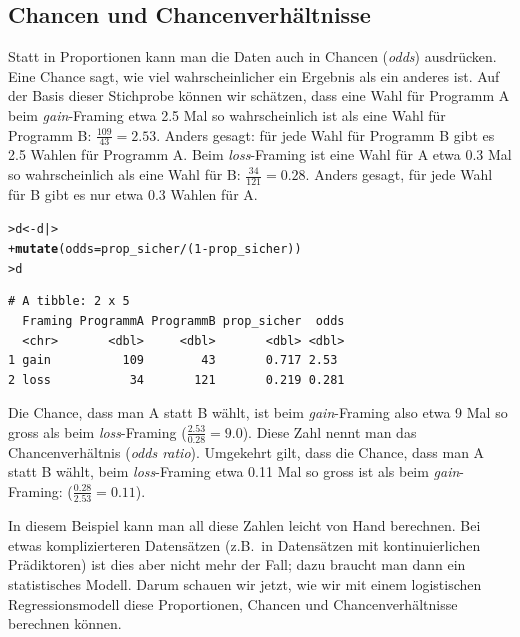 \documentclass[oneside, 10pt]{book}\usepackage[]{graphicx}\usepackage[]{xcolor}
\makeatletter
\newcommand{\hlnum}[1]{\textcolor[rgb]{0.686,0.059,0.569}{#1}}%
\newcommand{\hlopt}[1]{\textcolor[rgb]{0,0,0}{#1}}%
\newcommand{\hlstd}[1]{\textcolor[rgb]{0.345,0.345,0.345}{#1}}%
\newcommand{\hlkwb}[1]{\textcolor[rgb]{0.69,0.353,0.396}{#1}}%
\newcommand{\hlkwc}[1]{\textcolor[rgb]{0.333,0.667,0.333}{#1}}%
\newcommand{\hlkwd}[1]{\textcolor[rgb]{0.737,0.353,0.396}{\textbf{#1}}}%
\newenvironment{kframe}{%
 \def\at@end@of@kframe{}%
 \ifinner\ifhmode%
  \def\at@end@of@kframe{\end{minipage}}%
  \begin{minipage}{\columnwidth}%
 \fi\fi%
 \def\FrameCommand##1{\hskip\@totalleftmargin \hskip-\fboxsep
 \colorbox{shadecolor}{##1}\hskip-\fboxsep
     \hskip-\linewidth \hskip-\@totalleftmargin \hskip\columnwidth}%
 \MakeFramed {\advance\hsize-\width
   \@totalleftmargin\z@ \linewidth\hsize
   \@setminipage}}%
 {\par\unskip\endMakeFramed%
 \at@end@of@kframe}
\newenvironment{knitrout}{}{} %
\makeatother
\begin{document}
\subsection{Chancen und Chancenverhältnisse}
Statt in Proportionen kann man die Daten auch
in Chancen (\textit{odds}) ausdrücken. Eine Chance sagt, wie
viel wahrscheinlicher ein Ergebnis als ein anderes
ist. Auf der Basis dieser Stichprobe können
wir schätzen, dass eine Wahl für Programm A
beim \textit{gain}-Framing etwa 2.5 Mal
so wahrscheinlich ist als eine Wahl für Programm B:
$\frac{109}{43} = 2.53$. Anders gesagt: für
jede Wahl für Programm B gibt es 2.5 Wahlen für
Programm A.
Beim \textit{loss}-Framing ist eine
Wahl für A etwa 0.3 Mal so wahrscheinlich als eine
Wahl für B: $\frac{34}{121} = 0.28$. Anders gesagt,
für jede Wahl für B gibt es nur etwa 0.3 Wahlen für
A.
\begin{knitrout}
\color{fgcolor}\begin{kframe}
\begin{alltt}
\hlstd{> }\hlstd{d} \hlkwb{<-} \hlstd{d |>}
\hlstd{+ }  \hlkwd{mutate}\hlstd{(}\hlkwc{odds} \hlstd{= prop_sicher} \hlopt{/} \hlstd{(}\hlnum{1} \hlopt{-} \hlstd{prop_sicher))}
\hlstd{> }\hlstd{d}
\end{alltt}
\begin{verbatim}
# A tibble: 2 x 5
  Framing ProgrammA ProgrammB prop_sicher  odds
  <chr>       <dbl>     <dbl>       <dbl> <dbl>
1 gain          109        43       0.717 2.53 
2 loss           34       121       0.219 0.281
\end{verbatim}
\end{kframe}
\end{knitrout}

Die Chance, dass man A statt B wählt,
ist beim \textit{gain}-Framing also
etwa 9 Mal so gross als beim \textit{loss}-Framing
($\frac{2.53}{0.28} = 9.0$).
Diese Zahl nennt man das Chancenverhältnis (\textit{odds ratio}).
Umgekehrt gilt, dass die Chance, dass man A statt B wählt,
beim \textit{loss}-Framing etwa 0.11 Mal so gross
ist als beim \textit{gain}-Framing:
($\frac{0.28}{2.53} = 0.11$).

In diesem Beispiel kann man all diese Zahlen leicht von Hand berechnen.
Bei etwas komplizierteren Datensätzen (z.B.\ in Datensätzen mit
kontinuierlichen Prädiktoren) ist dies aber nicht mehr der Fall;
dazu braucht man dann ein statistisches Modell.
Darum schauen wir jetzt, wie wir mit einem logistischen Regressionsmodell
diese Proportionen, Chancen und Chancenverhältnisse berechnen können.
\end{document}
